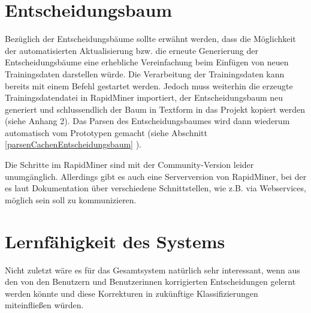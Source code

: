 \section{Entscheidungsbaum}
Bezüglich der Entscheidungsbäume sollte erwähnt werden, dass die Möglichkeit der automatisierten Aktualisierung bzw. die erneute Generierung der Entscheidungsbäume eine erhebliche Vereinfachung beim Einfügen von neuen Trainingsdaten darstellen würde. Die Verarbeitung der Trainingsdaten kann bereits mit einem Befehl gestartet werden. Jedoch muss weiterhin die erzeugte Trainingsdatendatei in RapidMiner importiert, der Entscheidungsbaum neu generiert und schlussendlich der Baum in Textform in das Projekt kopiert werden (siehe Anhang 2). Das Parsen des Entscheidungsbaumes wird dann wiederum automatisch vom Prototypen gemacht (siehe Abschnitt \ref{parsenCachenEntscheidungsbaum} ). 

Die Schritte im RapidMiner sind mit der Community-Version leider unumgänglich. Allerdings gibt es auch eine Serverversion von RapidMiner, bei der es laut Dokumentation über verschiedene Schnittstellen, wie z.B. via Webservices, möglich sein soll zu kommunizieren. 

\section{Lernfähigkeit des Systems}
Nicht zuletzt wäre es für das Gesamtsystem natürlich sehr interessant, wenn aus den von den Benutzern und Benutzerinnen korrigierten Entscheidungen gelernt werden könnte und diese Korrekturen in zukünftige Klassifizierungen miteinfließen würden. 
